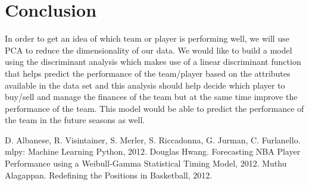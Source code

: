 \documentclass{acm_proc_article-sp}
\begin{document}
\section{Conclusion}
In order to get an idea of which team or player is performing well, we will use PCA to reduce the dimensionality of our data. We would like to build a model using the discriminant analysis which makes use of a linear discriminant function that helps predict the performance of the team/player based on the attributes available in the data set and this analysis should help decide which player to buy/sell and manage the finances of the team but at the same time improve the performance of the team. This model would be able to predict the performance of the team in the future seasons as well.

\begin{thebibliography}{}
D. Albanese, R. Visintainer, S. Merler, S. Riccadonna, G. Jurman, C. Furlanello. mlpy: Machine Learning Python, 2012.
Douglas Hwang. Forecasting NBA Player Performance using a Weibull-Gamma Statistical Timing Model, 2012.
\setlength{\itemindent}{0.13in}
Muthu Alagappan. Redefining the Positions in Basketball, 2012.
\end{thebibliography}
\end{document}
